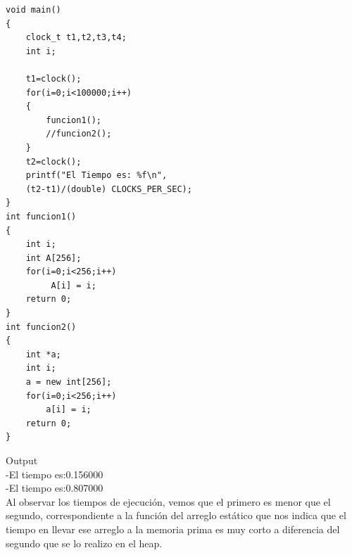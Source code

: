 \documentclass[12pt,oneside]{article}
\begin{document}
\begin{itemize}
\begin{lstlisting}[frame=single]
void main()
{
	clock_t t1,t2,t3,t4;
	int i;

	t1=clock(); 
	for(i=0;i<100000;i++)
	{
		funcion1();
		//funcion2();		
	}
	t2=clock(); 
	printf("El Tiempo es: %f\n",
	(t2-t1)/(double) CLOCKS_PER_SEC);
}
int funcion1()
{
	int i;
	int A[256];
	for(i=0;i<256;i++)
	   	 A[i] = i;
	return 0;
}
int funcion2()
{
	int *a;
	int i;
	a = new int[256];
	for(i=0;i<256;i++)
		a[i] = i;  
	return 0;
}
\end{lstlisting}
Output\\
-El tiempo es:0.156000\\
-El tiempo es:0.807000\\
Al observar los tiempos de ejecución, vemos que el primero es menor que el segundo, correspondiente a la función del arreglo estático que nos indica que el tiempo en llevar ese arreglo a la memoria prima es muy corto a diferencia del segundo que se lo realizo en el heap.

\end{itemize}
\end{document}
